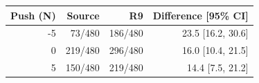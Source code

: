 \begin{tabular}{rrrr}
\toprule
Push (N) & Source & R9 & Difference [95\% CI] \\
\midrule
-5 & 73/480 & 186/480 & 23.5 [16.2, 30.6] \\
0 & 219/480 & 296/480 & 16.0 [10.4, 21.5] \\
5 & 150/480 & 219/480 & 14.4 [7.5, 21.2] \\
\bottomrule
\end{tabular}

